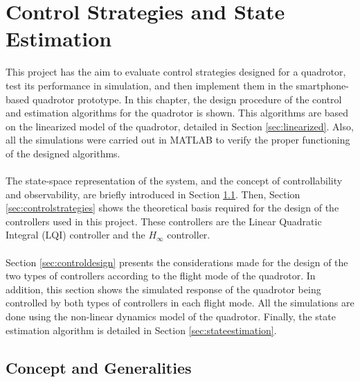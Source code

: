 \chapter{Control Strategies and State Estimation} \label{ch:controlandestimation}
This project has the aim to evaluate control strategies designed for a quadrotor, test its performance in simulation, and then implement them in the smartphone-based quadrotor prototype. In this chapter, the design procedure of the control and estimation algorithms for the quadrotor is shown. This algorithms are based on the linearized model of the quadrotor, detailed in Section \ref{sec:linearized}. Also, all the simulations were carried out in MATLAB to verify the proper functioning of the designed algorithms.
\\\\
The state-space representation of the system, and the concept of controllability and observability, are briefly introduced in Section \ref{sec:generalities}. Then, Section \ref{sec:controlstrategies} shows the theoretical basis required for the design of the controllers used in this project. These controllers are the Linear Quadratic Integral (LQI) controller and the $H_\infty$ controller.
\\\\
Section \ref{sec:controldesign} presents the considerations made for the design of the two types of controllers according to the flight mode of the quadrotor. In addition, this section shows the simulated response of the quadrotor being controlled by both types of controllers in each flight mode. All the simulations are done using the non-linear dynamics model of the quadrotor. Finally, the state estimation algorithm is detailed in Section \ref{sec:stateestimation}.

\section{Concept and Generalities}
\label{sec:generalities}


